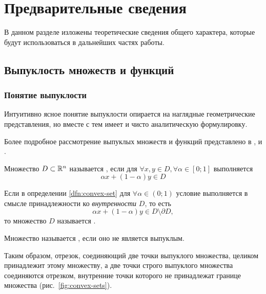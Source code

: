 \section{Предварительные сведения}
В данном разделе изложены теоретические сведения общего характера,
которые будут использоваться в дальнейших частях работы.

\subsection{Выпуклость множеств и функций}

\subsubsection{Понятие выпуклости}
\label{sec:convexity}
Интуитивно ясное понятие выпуклости опирается на наглядные
геометрические представления, но вместе с тем имеет и чисто
аналитическую формулировку.

Более подробное рассмотрение выпуклых множеств и функций представлено
в \cite{fikhtengolz03}, \cite{kolmogorov72} и \cite{polovinkin04}.

\begin{dfn}
  \label{dfn:convex-set}
  Множество $D \subset \mathbb{R}^n$ называется , если
  для $\forall x, y \in D, \forall \alpha \in [0;1]$ выполняется
  \begin{equation*}
    \alpha x + (1-\alpha) y \in D
  \end{equation*}
\end{dfn}
\begin{dfn}
  Если в определении \ref{dfn:convex-set} для $\forall \alpha \in
  (0;1)$ условие выполняется в смысле принадлежности ко
  \emph{внутренности} $D$, то есть
  \begin{equation*}
    \alpha x + (1-\alpha) y \in D \setminus \partial D,
  \end{equation*}
  то множество $D$ называется .
\end{dfn}
\begin{dfn}
  Множество называется , если оно не является
  выпуклым.
\end{dfn}
Таким образом, отрезок, соединяющий две точки выпуклого множества,
целиком принадлежит этому множеству, а две точки строго выпуклого
множества соединяются отрезком, внутренние точки которого не
принадлежат границе множества (рис. \ref{fig:convex-sets}).



